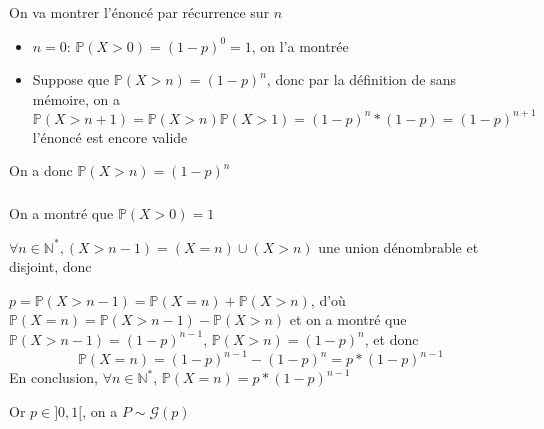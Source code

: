 \documentclass[a4paper,12pt]{book}
\begin{document}
On va montrer l'énoncé par récurrence sur $n$
\begin{itemize}
    \item $n=0$: $\mathbb{P}(X>0)=(1-p)^0=1$, on l'a montrée
    \item Suppose que $\mathbb{P}(X>n)=(1-p)^n$, donc par la définition de sans mémoire, on a 
          $$\mathbb{P}(X>n+1)=\mathbb{P}(X>n)\mathbb{P}(X>1)=(1-p)^n*(1-p)=(1-p)^{n+1}$$
          l'énoncé est encore valide
\end{itemize}
On a donc $\boxed{\mathbb{P}(X>n)=(1-p)^n}$
\subsubsection{}
On a montré que $\mathbb{P}(X>0)=1$

$\forall n \in \mathbb{N}^{*}, (X>n-1)=(X=n) \cup (X>n)$ une union dénombrable et disjoint, donc 
          
$p=\mathbb{P}(X>n-1)=\mathbb{P}(X=n)+\mathbb{P}(X>n)$, d'où $\mathbb{P}(X=n)=\mathbb{P}(X>n-1)-\mathbb{P}(X>n)$
et on a montré que $\mathbb{P}(X>n-1)=(1-p)^{n-1}$, $\mathbb{P}(X>n)=(1-p)^{n}$, et donc 
$$
\mathbb{P}(X=n)=(1-p)^{n-1}-(1-p)^{n}=p*(1-p)^{n-1}
$$
En conclusion, $\forall n \in \mathbb{N}^{*}$, $\mathbb{P}(X=n)=p*(1-p)^{n-1}$

Or $p \in ]0,1[$, on a $\boxed{P \sim \mathscr{G}(p)}$
\end{document}
